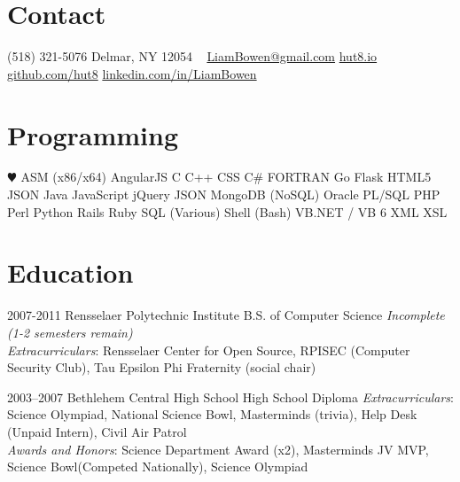 \documentclass[]{friggeri-cv} %
\begin{document}


\begin{aside} %
\section{Contact}
(518) 321-5076
Delmar, NY 12054
~
\href{mailto:LiamBowen@gmail.com}{LiamBowen@gmail.com}
\href{http://hut8.io}{hut8.io}
\href{https://github.com/hut8}{github.com/hut8}
\href{https://linkedin.com/in/LiamBowen}{linkedin.com/in/LiamBowen}
~
\section{Programming}
{\color{red} $\varheartsuit$}
ASM (x86/x64)
AngularJS
C
C++
CSS
C\#
FORTRAN
Go
Flask
HTML5
JSON
Java
JavaScript
jQuery
JSON
MongoDB (NoSQL)
Oracle PL/SQL
PHP
Perl
Python
Rails
Ruby
SQL (Various)
Shell (Bash)
VB.NET / VB 6
XML
XSL
\end{aside}



\section{Education}

\begin{entrylist}


\entry
{2007-2011}
{Rensselaer Polytechnic Institute}
{B.S. of Computer Science}
{\emph{Incomplete (1-2 semesters remain)}
\\ \emph{Extracurriculars}: Rensselaer Center for Open Source, RPISEC (Computer Security Club), Tau Epsilon Phi Fraternity (social chair) }


\entry
{2003--2007}
{Bethlehem Central High School}
{High School Diploma}
{\emph{Extracurriculars}: Science Olympiad, National Science Bowl, Masterminds (trivia), Help Desk (Unpaid Intern), Civil Air Patrol
\\ \emph{Awards and Honors}: Science Department Award (x2), Masterminds JV MVP, Science Bowl(Competed Nationally), Science Olympiad}


\end{entrylist}
\end{document}
